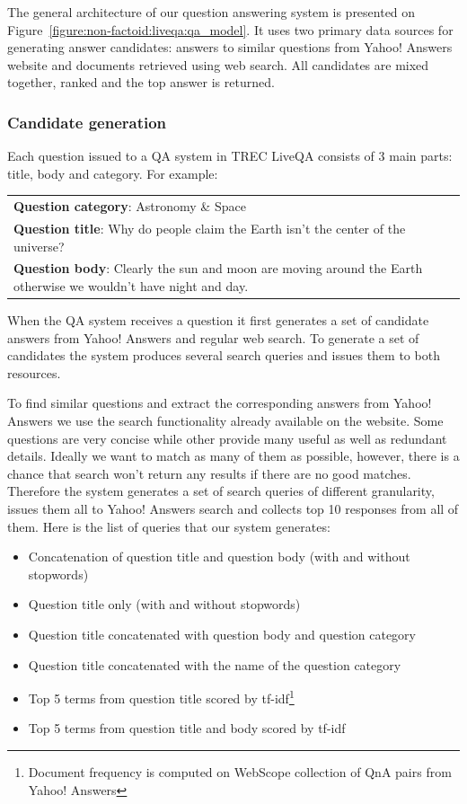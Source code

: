 The general architecture of our question answering system is presented on Figure~\ref{figure:non-factoid:liveqa:qa_model}.
It uses two primary data sources for generating answer candidates: answers to similar questions from Yahoo! Answers website and documents retrieved using web search. 
All candidates are mixed together, ranked and the top answer is returned.

\subsubsection{Candidate generation}
\label{section:non-factoid:liveqa:architecture:candidates}

Each question issued to a QA system in TREC LiveQA consists of 3 main parts: title, body and category.
For example:

\vspace{3mm}
\begin{tabular}{|p{15cm}|}
\hline
\textbf{Question category}: Astronomy \& Space\\
\textbf{Question title}: Why do people claim the Earth isn't the center of the universe?\\
\textbf{Question body}: Clearly the sun and moon are moving around the Earth otherwise we wouldn't have night and day.\\
\hline
\end{tabular}
\vspace{3mm}

When the QA system receives a question it first generates a set of candidate answers from Yahoo! Answers and regular web search.
To generate a set of candidates the system produces several search queries and issues them to both resources.

To find similar questions and extract the corresponding answers from Yahoo! Answers we use the search functionality already available on the website.
Some questions are very concise while other provide many useful as well as redundant details.
Ideally we want to match as many of them as possible, however, there is a chance that search won't return any results if there are no good matches.
Therefore the system generates a set of search queries of different granularity, issues them all to Yahoo! Answers search and collects top 10 responses from all of them.
Here is the list of queries that our system generates:
\begin{itemize}
	\item Concatenation of question title and question body (with and without stopwords)
	\item Question title only (with and without stopwords)
	\item Question title concatenated with question body and question category
	\item Question title concatenated with the name of the question category
	\item Top 5 terms from question title scored by tf-idf\footnote{Document frequency is computed on WebScope collection of QnA pairs from Yahoo! Answers}
	\item Top 5 terms from question title and body scored by tf-idf
\end{itemize}

